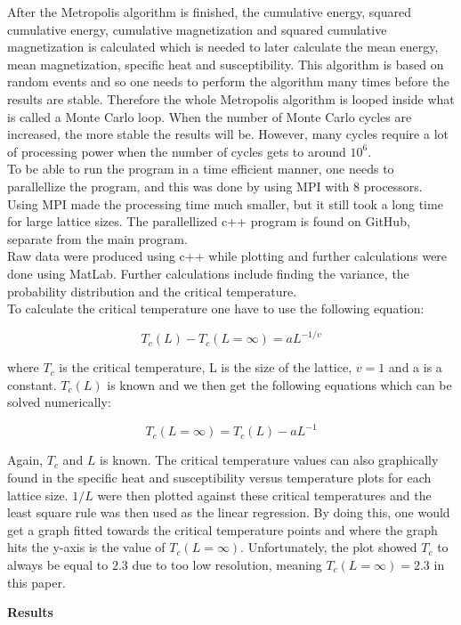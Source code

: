 \documentclass[10pt,a4paper]{article}
\begin{document}
\noindent After the Metropolis algorithm is finished, the cumulative energy, squared cumulative energy, cumulative magnetization and squared cumulative magnetization is calculated which is needed to later calculate the mean energy, mean magnetization, specific heat and susceptibility. This algorithm is based on random events and so one needs to perform the algorithm many times before the results are stable. Therefore the whole Metropolis algorithm is looped inside what is called a Monte Carlo loop. When the number of Monte Carlo cycles are increased, the more stable the results will be. However, many cycles require a lot of processing power when the number of cycles gets to around $10^6$.
\\
To be able to run the program in a time efficient manner, one needs to parallellize the program, and this was done by using MPI with 8 processors. Using MPI made the processing time much smaller, but it still took a long time for large lattice sizes. The parallellized c++ program is found on GitHub, separate from the main program.
\\
Raw data were produced using c++ while plotting and further calculations were done using MatLab. Further calculations include finding the variance, the probability distribution and the critical temperature.  
\\
To calculate the critical temperature one have to use the following equation:

$$
T_c(L) - T_c(L=\infty) = aL^{-1/v}
$$

\noindent where $T_c$ is the critical temperature, L is the size of the lattice, $v = 1$ and a is a constant. $T_c(L)$ is known and we then get the following equations which can be solved numerically:

$$
T_c(L = \infty) = T_c(L) - aL^{-1}
$$

\noindent Again, $T_c$ and $L$ is known. The critical temperature values can also graphically found in the specific heat and susceptibility versus temperature plots for each lattice size. $1/L$ were then plotted against these critical temperatures and the least square rule was then used as the linear regression. By doing this, one would get a graph fitted towards the critical temperature points and where the graph hits the y-axis is the value of $T_c(L = \infty)$. Unfortunately, the plot showed $T_c$ to always be equal to $2.3$ due to too low resolution, meaning $T_c(L = \infty) = 2.3$ in this paper.

\newpage

\begin{center}
{\LARGE\bf Results}
\end{center}
\end{document}
